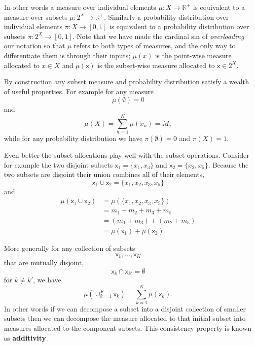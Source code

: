 \documentclass[
  letterpaper,
  DIV=11,
  numbers=noendperiod]{scrartcl}
\begin{document}
In other words a measure over individual elements
\(\mu : X \rightarrow \mathbb{R}^{+}\) is equivalent to a measure over
subsets \(\mu : 2^{X} \rightarrow \mathbb{R}^{+}\). Similarly a
probability distribution over individual elements
\(\pi : X \rightarrow [0, 1]\) is equivalent to a probability
distribution over subsets \(\pi : 2^{X} \rightarrow [0, 1]\). Note that
we have made the cardinal sin of \emph{overloading} our notation so that
\(\mu\) refers to both types of measures, and the only way to
differentiate them is through their inputs; \(\mu(x)\) is the point-wise
measure allocated to \(x \in X\) and \(\mu( \mathsf{x} )\) is the
subset-wise measure allocated to \(\mathsf{x} \in 2^X\).

By construction any subset measure and probability distribution satisfy
a wealth of useful properties. For example for any measure \[
\mu( \emptyset ) = 0
\] and \[
\mu( X ) = \sum_{n = 1}^{N} \mu(x_{n}) = M,
\] while for any probability distribution we have
\(\pi( \emptyset ) = 0\) and \(\pi( X ) = 1\).

Even better the subset allocations play well with the subset operations.
Consider for example the two disjoint subsets
\(\mathsf{x}_{1} = \{ x_{1}, x_{3} \}\) and
\(\mathsf{x}_{2} = \{ x_{2}, x_{5} \}\). Because the two subsets are
disjoint their union combines all of their elements, \[
\mathsf{x}_{1} \cup \mathsf{x}_{2} =
\{ x_{1}, x_{2}, x_{3}, x_{5} \}
\] and \begin{align*}
\mu ( \mathsf{x}_{1} \cup \mathsf{x}_{2} )
&=
\mu ( \{ x_{1}, x_{2}, x_{3}, x_{5} \} )
\\
&=
m_{1} + m_{2} + m_{3} + m_{5}
\\
&=
( m_{1} + m_{3} ) + ( m_{2} + m_{5} )
\\
&=
\mu( \mathsf{x}_{1} ) + \mu( \mathsf{x}_{2} ).
\end{align*}

More generally for any collection of subsets \[
\mathsf{x}_{1}, \ldots, \mathsf{x}_{K}
\] that are mutually disjoint, \[
\mathsf{x}_{k} \cap \mathsf{x}_{k'} = \emptyset
\] for \(k \ne k'\), we have \[
\mu ( \cup_{k = 1}^{K} \mathsf{x}_{k} )
=
\sum_{k = 1}^{K} \mu ( \mathsf{x}_{k} ).
\] In other words if we can decompose a subset into a disjoint
collection of smaller subsets then we can decompose the measure
allocated to that initial subset into measures allocated to the
component subsets. This consistency property is known as
\textbf{additivity}.
\end{document}
